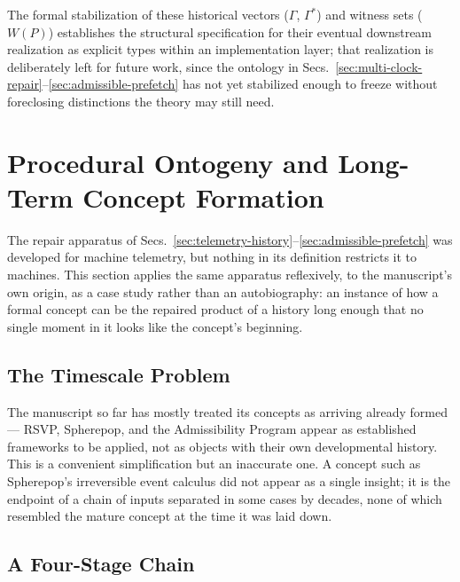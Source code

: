 \documentclass[12pt,a4paper]{article}
\theoremstyle{plain}
\theoremstyle{definition}
\theoremstyle{remark}
\begin{document}
The formal stabilization of these historical vectors ($\Gamma$, $\Gamma^{*}$) and witness sets ($W(P)$) establishes the structural specification for their eventual downstream realization as explicit types within an implementation layer; that realization is deliberately left for future work, since the ontology in Secs.~\ref{sec:multi-clock-repair}--\ref{sec:admissible-prefetch} has not yet stabilized enough to freeze without foreclosing distinctions the theory may still need.

\section{Procedural Ontogeny and Long-Term Concept Formation}
\label{sec:procedural-ontogeny}

The repair apparatus of Secs.~\ref{sec:telemetry-history}–\ref{sec:admissible-prefetch} was developed for machine telemetry, but nothing in its definition restricts it to machines. This section applies the same apparatus reflexively, to the manuscript's own origin, as a case study rather than an autobiography: an instance of how a formal concept can be the repaired product of a history long enough that no single moment in it looks like the concept's beginning.

\subsection{The Timescale Problem}
\label{subsec:timescale-problem}

The manuscript so far has mostly treated its concepts as arriving already formed — RSVP, Spherepop, and the Admissibility Program appear as established frameworks to be applied, not as objects with their own developmental history. This is a convenient simplification but an inaccurate one. A concept such as Spherepop's irreversible event calculus did not appear as a single insight; it is the endpoint of a chain of inputs separated in some cases by decades, none of which resembled the mature concept at the time it was laid down.

\subsection{A Four-Stage Chain}
\label{subsec:four-stage-chain}
\end{document}
